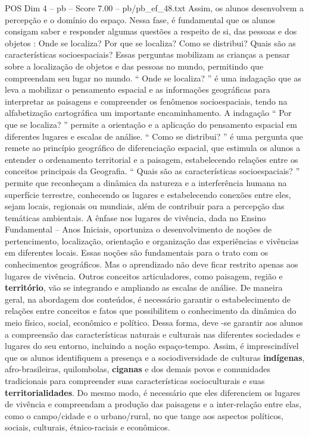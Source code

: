 \begin{textsample}{POS Dim 4 – pb – Score 7.00 – pb/pb\_ef\_48.txt}
Assim, os alunos desenvolvem a percepção e o domínio do espaço.
Nessa fase, é fundamental que os alunos consigam saber e responder algumas questões a respeito de si, das pessoas e dos objetos : Onde se localiza?
Por que se localiza?
Como se distribui?
Quais são as características socioespaciais?
Essas perguntas mobilizam as crianças a pensar sobre a localização de objetos e das pessoas no mundo, permitindo que compreendam seu lugar no mundo. “ Onde se localiza? ” é uma indagação que as leva a mobilizar o pensamento espacial e as informações geográficas para interpretar as paisagens e compreender os fenômenos socioespaciais, tendo na alfabetização cartográfica um importante encaminhamento.
A indagação “ Por que se localiza? ” permite a orientação e a aplicação do pensamento espacial em diferentes lugares e escalas de análise. “ Como se distribui? ” é uma pergunta que remete ao princípio geográfico de diferenciação espacial, que estimula os alunos a entender o ordenamento territorial e a paisagem, estabelecendo relações entre os conceitos principais da Geografia. “ Quais são as características socioespaciais? ” permite que reconheçam a dinâmica da natureza e a interferência humana na superfície terrestre, conhecendo os lugares e estabelecendo conexões entre eles, sejam locais, regionais ou mundiais, além de contribuir para a percepção das temáticas ambientais.
A ênfase nos lugares de vivência, dada no Ensino Fundamental – Anos Iniciais, oportuniza o desenvolvimento de noções de pertencimento, localização, orientação e organização das experiências e vivências em diferentes locais.
Essas noções são fundamentais para o trato com os conhecimentos geográficos.
Mas o aprendizado não deve ficar restrito apenas aos lugares de vivência.
Outros conceitos articuladores, como paisagem, região e \textbf{território}, vão se integrando e ampliando as escalas de análise.
De maneira geral, na abordagem dos conteúdos, é necessário garantir o estabelecimento de relações entre conceitos e fatos que possibilitem o conhecimento da dinâmica do meio físico, social, econômico e político.
Dessa forma, deve -se garantir aos alunos a compreensão das características naturais e culturais nas diferentes sociedades e lugares do seu entorno, incluindo a noção espaço-tempo.
Assim, é imprescindível que os alunos identifiquem a presença e a sociodiversidade de culturas \textbf{indígenas}, afro-brasileiras, quilombolas, \textbf{ciganas} e dos demais povos e comunidades tradicionais para compreender suas características socioculturais e suas \textbf{territorialidades}.
Do mesmo modo, é necessário que eles diferenciem os lugares de vivência e compreendam a produção das paisagens e a inter-relação entre elas, como o campo/cidade e o urbano/rural, no que tange aos aspectos políticos, sociais, culturais, étnico-raciais e econômicos.

\end{textsample}
